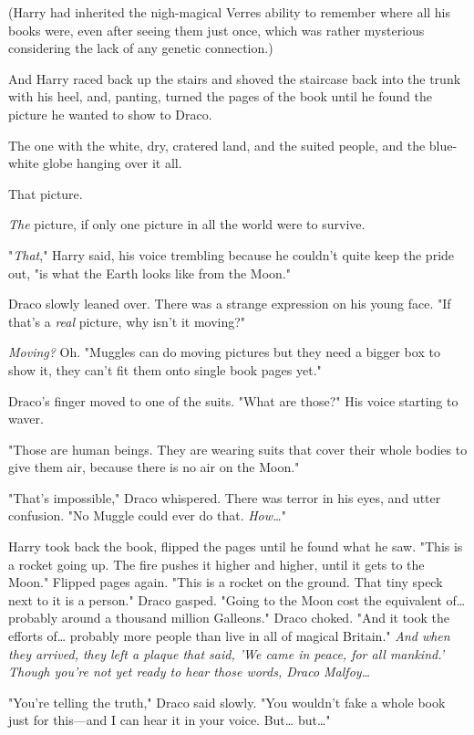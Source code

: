 (Harry had inherited the nigh-magical Verres ability to remember where all his 
books were, even after seeing them just once, which was rather mysterious 
considering the lack of any genetic connection.)

And Harry raced back up the stairs and shoved the staircase back into the trunk 
with his heel, and, panting, turned the pages of the book until he found the 
picture he wanted to show to Draco.

The one with the white, dry, cratered land, and the suited people, and the 
blue-white globe hanging over it all.

That picture.

\emph{The} picture, if only one picture in all the world were to survive.

"\emph{That}," Harry said, his voice trembling because he couldn't quite keep 
the pride out, "is what the Earth looks like from the Moon."

Draco slowly leaned over. There was a strange expression on his young face. "If 
that's a \emph{real} picture, why isn't it moving?"

\emph{Moving?} Oh. "Muggles can do moving pictures but they need a bigger box 
to show it, they can't fit them onto single book pages yet."

Draco's finger moved to one of the suits. "What are those?" His voice starting 
to waver.

"Those are human beings. They are wearing suits that cover their whole bodies 
to give them air, because there is no air on the Moon."

"That's impossible," Draco whispered. There was terror in his eyes, and utter 
confusion. "No Muggle could ever do that. \emph{How{\ldots}}"

Harry took back the book, flipped the pages until he found what he saw. "This 
is a rocket going up. The fire pushes it higher and higher, until it gets to 
the Moon." Flipped pages again. "This is a rocket on the ground. That tiny 
speck next to it is a person." Draco gasped. "Going to the Moon cost the 
equivalent of{\ldots} probably around a thousand million Galleons." Draco 
choked. "And it took the efforts of{\ldots} probably more people than live in 
all of magical Britain." \emph{And when they arrived, they left a plaque that 
said, 'We came in peace, for all mankind.' Though you're not yet ready to hear 
those words, Draco Malfoy{\ldots}}

"You're telling the truth," Draco said slowly. "You wouldn't fake a whole book 
just for this---and I can hear it in your voice. But{\ldots} but{\ldots}"

